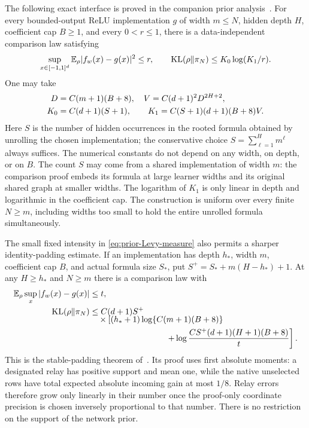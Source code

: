 The following exact interface is proved in the companion prior analysis~\cite{levy-core}. For every bounded-output ReLU implementation $g$ of width $m\le N$, hidden depth $H$, coefficient cap $B\ge1$, and every $0<r\le1$, there is a data-independent comparison law satisfying
\begin{equation}
 \sup_{x\in[-1,1]^d}\mathbb E_\rho|f_w(x)-g(x)|^2\le r,
 \qquad \operatorname{KL}(\rho\|\pi_N)\le K_0\log(K_1/r).
 \label{eq:levy-native-interface}
\end{equation}
One may take
\begin{align}
 D&=C(m+1)(B+8),\quad V=C(d+1)^2D^{2H+2},\notag\\
 K_0&=C(d+1)(S+1),\qquad
 K_1=C(S+1)(d+1)(B+8)V.
 \label{eq:levy-native-resources}
\end{align}
Here $S$ is the number of hidden occurrences in the rooted formula obtained by unrolling the chosen implementation; the conservative choice $S=\sum_{\ell=1}^H m^\ell$ always suffices. The numerical constants do not depend on any width, on depth, or on $B$. The count $S$ may come from a shared implementation of width $m$: the comparison proof embeds its formula at large learner widths and its original shared graph at smaller widths. The logarithm of $K_1$ is only linear in depth and logarithmic in the coefficient cap. The construction is uniform over every finite $N\ge m$, including widths too small to hold the entire unrolled formula simultaneously.

The small fixed intensity in \eqref{eq:prior-Levy-measure} also permits a sharper identity-padding estimate. If an implementation has depth $h_*$, width $m$, coefficient cap $B$, and actual formula size $S_*$, put $S^+=S_*+m(H-h_*)+1$. At any $H\ge h_*$ and $N\ge m$ there is a comparison law with
\begin{align}
 \E_\rho\sup_x|f_w(x)-g(x)|&\le t,\notag\\
 \operatorname{KL}(\rho\|\pi_N)&\le
 C(d+1)S^+\notag\\[-2mm]
 &\quad\times\left[(h_*+1)\log\{C(m+1)(B+8)\}\right.\notag\\
 &\hspace{32mm}\left.+\log\frac{CS^+(d+1)(H+1)(B+8)}t\right].
 \label{eq:stable-padding-interface}
\end{align}
This is the stable-padding theorem of~\cite{levy-core}. Its proof uses first absolute moments: a designated relay has positive support and mean one, while the native unselected rows have total expected absolute incoming gain at most $1/8$. Relay errors therefore grow only linearly in their number once the proof-only coordinate precision is chosen inversely proportional to that number. There is no restriction on the support of the network prior.


